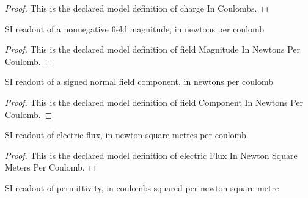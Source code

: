 \begin{proof}
  This is the declared model definition of charge In Coulombs.
\end{proof}
\begin{definition}
  \label{def:physics:phyx-mini-0841:phyxminiproblems-problemphyxmini0841-fieldmagnitudeinnewtonspercoulomb}
  SI readout of a nonnegative field magnitude, in newtons per coulomb
\end{definition}
\begin{proof}
  This is the declared model definition of field Magnitude In Newtons Per Coulomb.
\end{proof}
\begin{definition}
  \label{def:physics:phyx-mini-0841:phyxminiproblems-problemphyxmini0841-fieldcomponentinnewtonspercoulomb}
  SI readout of a signed normal field component, in newtons per coulomb
\end{definition}
\begin{proof}
  This is the declared model definition of field Component In Newtons Per Coulomb.
\end{proof}
\begin{definition}
  \label{def:physics:phyx-mini-0841:phyxminiproblems-problemphyxmini0841-electricfluxinnewtonsquaremeterspercoulomb}
  SI readout of electric flux, in newton-square-metres per coulomb
\end{definition}
\begin{proof}
  This is the declared model definition of electric Flux In Newton Square Meters Per Coulomb.
\end{proof}
\begin{definition}[permittivity In SI]
  \label{def:physics:phyx-mini-0841:phyxminiproblems-problemphyxmini0841-permittivityinsi}
  SI readout of permittivity, in coulombs squared per newton-square-metre
\end{definition}
